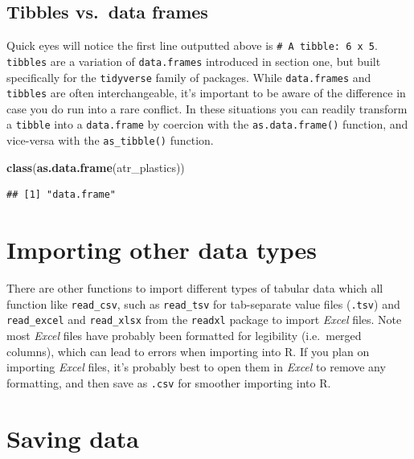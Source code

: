 \documentclass[
]{book}
\newenvironment{Shaded}{\begin{snugshade}}{\end{snugshade}}
\newcommand{\FunctionTok}[1]{\textcolor[rgb]{0.13,0.29,0.53}{\textbf{#1}}}
\newcommand{\NormalTok}[1]{#1}
\begin{document}
\hypertarget{tibbles-vs.-data-frames}{%
\subsection{Tibbles vs.~data frames}\label{tibbles-vs.-data-frames}}

Quick eyes will notice the first line outputted above is \texttt{\#\ A\ tibble:\ 6\ x\ 5}. \texttt{tibbles} are a variation of \texttt{data.frames} introduced in section one, but built specifically for the \texttt{tidyverse} family of packages. While \texttt{data.frames} and \texttt{tibbles} are often interchangeable, it's important to be aware of the difference in case you do run into a rare conflict. In these situations you can readily transform a \texttt{tibble} into a \texttt{data.frame} by coercion with the \texttt{as.data.frame()} function, and vice-versa with the \texttt{as\_tibble()} function.

\begin{Shaded}
\begin{Highlighting}[]
\FunctionTok{class}\NormalTok{(}\FunctionTok{as.data.frame}\NormalTok{(atr\_plastics))}
\end{Highlighting}
\end{Shaded}

\begin{verbatim}
## [1] "data.frame"
\end{verbatim}

\hypertarget{importing-other-data-types}{%
\section{Importing other data types}\label{importing-other-data-types}}

There are other functions to import different types of tabular data which all function like \texttt{read\_csv}, such as \texttt{read\_tsv} for tab-separate value files (\texttt{.tsv}) and \texttt{read\_excel} and \texttt{read\_xlsx} from the \texttt{readxl} package to import \emph{Excel} files. Note most \emph{Excel} files have probably been formatted for legibility (i.e.~merged columns), which can lead to errors when importing into R. If you plan on importing \emph{Excel} files, it's probably best to open them in \emph{Excel} to remove any formatting, and then save as \texttt{.csv} for smoother importing into R.

\hypertarget{saving-data}{%
\section{Saving data}\label{saving-data}}
\end{document}
